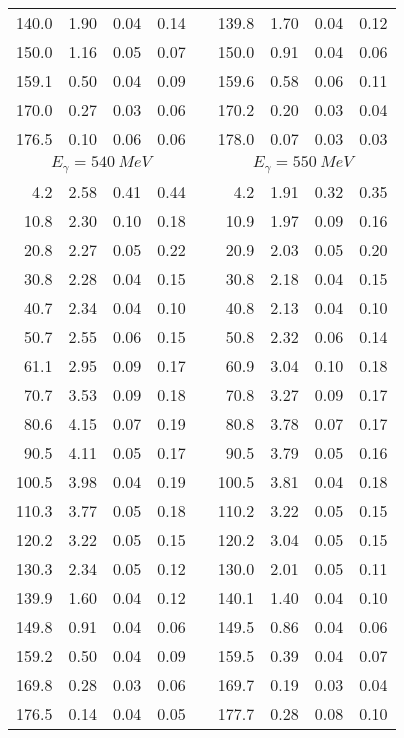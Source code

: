 \begin{table}[htbp]
\begin{center}
\begin{tabular}{|r|r|c|c|l|r|r|c|c|}
140.0 &  1.90 &  0.04 &  0.14 & & 139.8 &  1.70 &  0.04 &  0.12 \\ 
150.0 &  1.16 &  0.05 &  0.07 & & 150.0 &  0.91 &  0.04 &  0.06 \\ 
159.1 &  0.50 &  0.04 &  0.09 & & 159.6 &  0.58 &  0.06 &  0.11 \\ 
170.0 &  0.27 &  0.03 &  0.06 & & 170.2 &  0.20 &  0.03 &  0.04 \\ 
176.5 &  0.10 &  0.06 &  0.06 & & 178.0 &  0.07 &  0.03 &  0.03 \\ 
\hline 
\hline 
\multicolumn{4}{|c|}{ $E_{\gamma}=540~MeV$} & & 
\multicolumn{4}{c|}{ $E_{\gamma}=550~MeV$} \\ 
\cline{1-4} 
\cline{6-9} 
  4.2 &  2.58 &  0.41 &  0.44 & &   4.2 &  1.91 &  0.32 &  0.35 \\ 
 10.8 &  2.30 &  0.10 &  0.18 & &  10.9 &  1.97 &  0.09 &  0.16 \\ 
 20.8 &  2.27 &  0.05 &  0.22 & &  20.9 &  2.03 &  0.05 &  0.20 \\ 
 30.8 &  2.28 &  0.04 &  0.15 & &  30.8 &  2.18 &  0.04 &  0.15 \\ 
 40.7 &  2.34 &  0.04 &  0.10 & &  40.8 &  2.13 &  0.04 &  0.10 \\ 
 50.7 &  2.55 &  0.06 &  0.15 & &  50.8 &  2.32 &  0.06 &  0.14 \\ 
 61.1 &  2.95 &  0.09 &  0.17 & &  60.9 &  3.04 &  0.10 &  0.18 \\ 
 70.7 &  3.53 &  0.09 &  0.18 & &  70.8 &  3.27 &  0.09 &  0.17 \\ 
 80.6 &  4.15 &  0.07 &  0.19 & &  80.8 &  3.78 &  0.07 &  0.17 \\ 
 90.5 &  4.11 &  0.05 &  0.17 & &  90.5 &  3.79 &  0.05 &  0.16 \\ 
100.5 &  3.98 &  0.04 &  0.19 & & 100.5 &  3.81 &  0.04 &  0.18 \\ 
110.3 &  3.77 &  0.05 &  0.18 & & 110.2 &  3.22 &  0.05 &  0.15 \\ 
120.2 &  3.22 &  0.05 &  0.15 & & 120.2 &  3.04 &  0.05 &  0.15 \\ 
130.3 &  2.34 &  0.05 &  0.12 & & 130.0 &  2.01 &  0.05 &  0.11 \\ 
139.9 &  1.60 &  0.04 &  0.12 & & 140.1 &  1.40 &  0.04 &  0.10 \\ 
149.8 &  0.91 &  0.04 &  0.06 & & 149.5 &  0.86 &  0.04 &  0.06 \\ 
159.2 &  0.50 &  0.04 &  0.09 & & 159.5 &  0.39 &  0.04 &  0.07 \\ 
169.8 &  0.28 &  0.03 &  0.06 & & 169.7 &  0.19 &  0.03 &  0.04 \\ 
176.5 &  0.14 &  0.04 &  0.05 & & 177.7 &  0.28 &  0.08 &  0.10 \\ 
\cline{1-4} 
\cline{6-9} 
\end{tabular} 

\end{center} 
\end{table}
